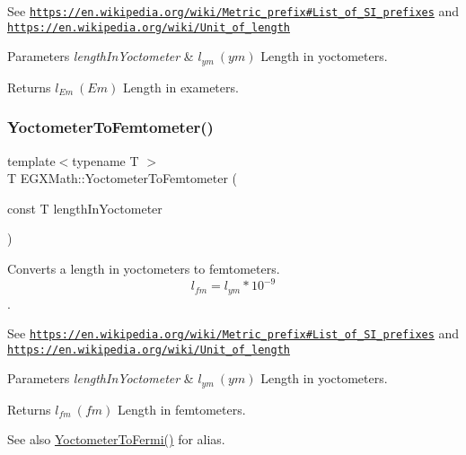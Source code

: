 See \href{https://en.wikipedia.org/wiki/Metric_prefix#List_of_SI_prefixes}{\tt https\+://en.\+wikipedia.\+org/wiki/\+Metric\+\_\+prefix\#\+List\+\_\+of\+\_\+\+S\+I\+\_\+prefixes} and \href{https://en.wikipedia.org/wiki/Unit_of_length}{\tt https\+://en.\+wikipedia.\+org/wiki/\+Unit\+\_\+of\+\_\+length} 
\begin{DoxyParams}{Parameters}
{\em length\+In\+Yoctometer} & $ l_{ym}\ (ym)$ Length in yoctometers. \\
\hline
\end{DoxyParams}
\begin{DoxyReturn}{Returns}
$ l_{Em}\ (Em)$ Length in exameters. 
\end{DoxyReturn}
\mbox{\label{group___e_g_x_math-_conversions-_length_conversions-_yoctometer-_s_i_ga2e4981232314be21ccfbe019886c5048}} 
\subsubsection{\texorpdfstring{Yoctometer\+To\+Femtometer()}{YoctometerToFemtometer()}}
{\footnotesize\ttfamily template$<$typename T $>$ \\
T E\+G\+X\+Math\+::\+Yoctometer\+To\+Femtometer (\begin{DoxyParamCaption}\item[{const T}]{length\+In\+Yoctometer }\end{DoxyParamCaption})}



Converts a length in yoctometers to femtometers. \[ l_{fm}=l_{ym} * 10^{-9} \]. 

See \href{https://en.wikipedia.org/wiki/Metric_prefix#List_of_SI_prefixes}{\tt https\+://en.\+wikipedia.\+org/wiki/\+Metric\+\_\+prefix\#\+List\+\_\+of\+\_\+\+S\+I\+\_\+prefixes} and \href{https://en.wikipedia.org/wiki/Unit_of_length}{\tt https\+://en.\+wikipedia.\+org/wiki/\+Unit\+\_\+of\+\_\+length} 
\begin{DoxyParams}{Parameters}
{\em length\+In\+Yoctometer} & $ l_{ym}\ (ym)$ Length in yoctometers. \\
\hline
\end{DoxyParams}
\begin{DoxyReturn}{Returns}
$ l_{fm}\ (fm)$ Length in femtometers. 
\end{DoxyReturn}
\begin{DoxySeeAlso}{See also}
\mbox{\hyperlink{group___e_g_x_math-_conversions-_length_conversions-_yoctometer-_non-_s_i_gadcf3b93b00bf0d160f27d3a1a4b8ed9f}{Yoctometer\+To\+Fermi()}} for alias. 
\end{DoxySeeAlso}
\mbox{\label{group___e_g_x_math-_conversions-_length_conversions-_yoctometer-_s_i_ga48f8e5df818edfde1006bf08ebdeee33}} 
